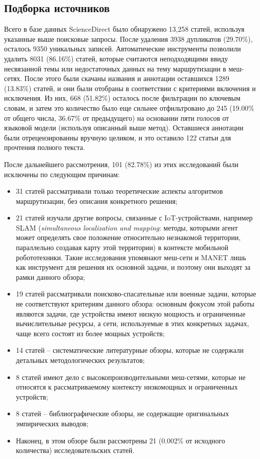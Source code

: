 \documentclass[%
]{report}
\begin{document}
\subsection{Подборка источников}\label{selection-of-sources-of-evidence-1}

Всего в базе данных ScienceDirect было обнаружено 13,258 статей,
используя указанные выше поисковые запросы.
После удаления 3938 дупликатов (29.70\%),
осталось 9350 уникальных записей.
Автоматические инструменты позволили удалить
8031 (86.16\%) статей,
которые считаются неподходящими
ввиду несвязанной темы или
недостаточных данных на тему маршрутизации в меш-сетях.
После этого были скачаны названия и аннотации
оставшихся 1289 (13.83\%) статей,
и они были отобраны в соответствии с
критериями включения и исключения.
Из них, 668 (51.82\%)
осталось после фильтрации по ключевым словам,
и затем это количество было еще сильнее отфильтровано до
245 (19.00\% от общего числа, 36.67\% от предыдущего)
на основании пяти голосов от языковой модели
(используя описанный выше метод).
Оставшиеся аннотации были отрецензированны вручную целиком,
и это оставило 122 статьи для прочтения полного текста.

После дальнейшего рассмотрения, 101 (82.78\%) из этих исследований
были исключены по следующим причинам:

\begin{itemize}
\item
  31 статей рассматривали только теоретические аспекты
  алгоритмов маршрутизации, без описания конкретного решения;
\item
  21 статей изучали другие вопросы, связанные с IoT-устройствами,
  например SLAM (\emph{simultaneous localization and mapping}: методы,
  которыми агент может
  определять свое положение относительно незнакомой территории,
  параллельно создавая карту этой территории) в 
  контексте мобильной робототехники.
  Такие исследования упомянают меш-сети и MANET
  лишь как инструмент для решения их основной задачи,
  и поэтому они выходят за рамки данного обзора;
\item
  19 статей рассматривали поисково-спасательные
  или военные задачи,
  которые не соответствуют критериям данного обзора:
  основным фокусом этой работы являются задачи, где устройства имеют низкую мощность
  и ограниченные вычислительные ресурсы,
  а сети, используемые в этих конкретных задачах,
  чаще всего состоят из более мощных устройств;
\item
  14 статей -- систематические литературные обзоры,
  которые не содержали детальных методологических результатов;
\item
  8 статей имеют дело с высокопроизводительными меш-сетями,
  которые не относятся к рассматриваемому контексту
  низкомощных и ограниченных устройств;
\item
  8 статей -- библиографические обзоры,
  не содержащие оригинальных эмпирических выводов;
\item
  Наконец, в этом обзоре были рассмотрены 21 (0.002\% от исходного количества)
  исследовательских статей.
\end{itemize}
\end{document}
